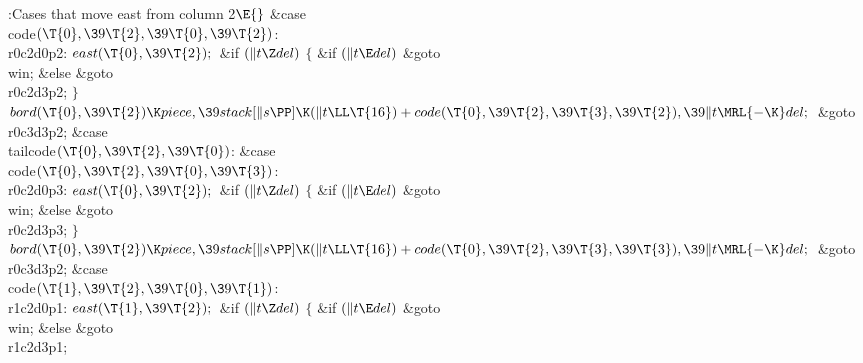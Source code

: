 \B{}:Cases that move east from column 2\X${}\E{}$%
\6
\4\&{case} \\{code}${}(\T{0},\39\T{2},\39\T{0},\39\T{2}){}$:\5
\\{r0c2d0p2}:\5
${}\\{east}(\T{0},\39\T{2});{}$\6
\&{if} ${}(\|t\Z\\{del}){}$\5
${}\{{}$\5
\1\&{if} ${}(\|t\E\\{del}){}$\1\5
\&{goto} \\{win};\5
\2\&{else}\1\5
\&{goto} \\{r0c2d3p2};\5
\2${}\}{}$\2\6
${}\\{bord}(\T{0},\39\T{2})\K\\{piece},\39\\{stack}[\|s\PP]\K(\|t\LL\T{16})+%
\\{code}(\T{0},\39\T{2},\39\T{3},\39\T{2}),\39\|t\MRL{-{\K}}\\{del};{}$\6
\&{goto} \\{r0c3d3p2};\6
\4\&{case} \\{tailcode}${}(\T{0},\39\T{2},\39\T{0}){}$:\5
\&{case} \\{code}${}(\T{0},\39\T{2},\39\T{0},\39\T{3}){}$:\5
\\{r0c2d0p3}:\5
${}\\{east}(\T{0},\39\T{2});{}$\6
\&{if} ${}(\|t\Z\\{del}){}$\5
${}\{{}$\5
\1\&{if} ${}(\|t\E\\{del}){}$\1\5
\&{goto} \\{win};\5
\2\&{else}\1\5
\&{goto} \\{r0c2d3p3};\5
\2${}\}{}$\2\6
${}\\{bord}(\T{0},\39\T{2})\K\\{piece},\39\\{stack}[\|s\PP]\K(\|t\LL\T{16})+%
\\{code}(\T{0},\39\T{2},\39\T{3},\39\T{3}),\39\|t\MRL{-{\K}}\\{del};{}$\6
\&{goto} \\{r0c3d3p2};\6
\4\&{case} \\{code}${}(\T{1},\39\T{2},\39\T{0},\39\T{1}){}$:\5
\\{r1c2d0p1}:\5
${}\\{east}(\T{1},\39\T{2});{}$\6
\&{if} ${}(\|t\Z\\{del}){}$\5
${}\{{}$\5
\1\&{if} ${}(\|t\E\\{del}){}$\1\5
\&{goto} \\{win};\5
\2\&{else}\1\5
\&{goto} \\{r1c2d3p1};\5
